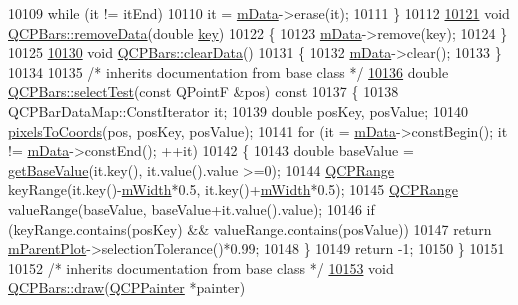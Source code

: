 \begin{DoxyCode}
10109   \textcolor{keywordflow}{while} (it != itEnd)
10110     it = \hyperlink{a00027_aef28d29d51ef84b608ecd22c55d531ff}{mData}->erase(it);
10111 \}
10112 
\hypertarget{a00115_source_l10121}{}\hyperlink{a00027_a837cc9848ad3edd40a6130b508493f93}{10121} \textcolor{keywordtype}{void} \hyperlink{a00027_a1fe9bcb57d670defea1bb65cadf43765}{QCPBars::removeData}(\textcolor{keywordtype}{double} \hyperlink{a00116_a94bb892c30911cd62cba0707a5395be4}{key})
10122 \{
10123   \hyperlink{a00027_aef28d29d51ef84b608ecd22c55d531ff}{mData}->remove(key);
10124 \}
10125 
\hypertarget{a00115_source_l10130}{}\hyperlink{a00027_a11dbbd707132f07f862dff13c5789c2b}{10130} \textcolor{keywordtype}{void} \hyperlink{a00027_a11dbbd707132f07f862dff13c5789c2b}{QCPBars::clearData}()
10131 \{
10132   \hyperlink{a00027_aef28d29d51ef84b608ecd22c55d531ff}{mData}->clear();
10133 \}
10134 
10135 \textcolor{comment}{/* inherits documentation from base class */}
\hypertarget{a00115_source_l10136}{}\hyperlink{a00027_a3b4aeb6d87d57dce496f5f83c21eabba}{10136} \textcolor{keywordtype}{double} \hyperlink{a00027_a3b4aeb6d87d57dce496f5f83c21eabba}{QCPBars::selectTest}(\textcolor{keyword}{const} QPointF &pos)\textcolor{keyword}{ const}
10137 \textcolor{keyword}{}\{
10138   QCPBarDataMap::ConstIterator it;
10139   \textcolor{keywordtype}{double} posKey, posValue;
10140   \hyperlink{a00024_a10408828446e9e0681c46d65120f382e}{pixelsToCoords}(pos, posKey, posValue);
10141   \textcolor{keywordflow}{for} (it = \hyperlink{a00027_aef28d29d51ef84b608ecd22c55d531ff}{mData}->constBegin(); it != \hyperlink{a00027_aef28d29d51ef84b608ecd22c55d531ff}{mData}->constEnd(); ++it)
10142   \{
10143     \textcolor{keywordtype}{double} baseValue = \hyperlink{a00027_ab60a3c4b8e7c59f0f14e25590d96fa4e}{getBaseValue}(it.key(), it.value().value >=0);
10144     \hyperlink{a00049}{QCPRange} keyRange(it.key()-\hyperlink{a00027_a7c4e0f2246f8133f48a9c3f24cf5b920}{mWidth}*0.5, it.key()+\hyperlink{a00027_a7c4e0f2246f8133f48a9c3f24cf5b920}{mWidth}*0.5);
10145     \hyperlink{a00049}{QCPRange} valueRange(baseValue, baseValue+it.value().value);
10146     \textcolor{keywordflow}{if} (keyRange.contains(posKey) && valueRange.contains(posValue))
10147       \textcolor{keywordflow}{return} \hyperlink{a00044_aa2a528433e44db02b8aef23c1f9f90ed}{mParentPlot}->selectionTolerance()*0.99;
10148   \}
10149   \textcolor{keywordflow}{return} -1;
10150 \}
10151 
10152 \textcolor{comment}{/* inherits documentation from base class */}
\hypertarget{a00115_source_l10153}{}\hyperlink{a00027_a42b894e34dac799f90ff3700706b31df}{10153} \textcolor{keywordtype}{void} \hyperlink{a00027_a42b894e34dac799f90ff3700706b31df}{QCPBars::draw}(\hyperlink{a00047}{QCPPainter} *painter)

\end{DoxyCode}
